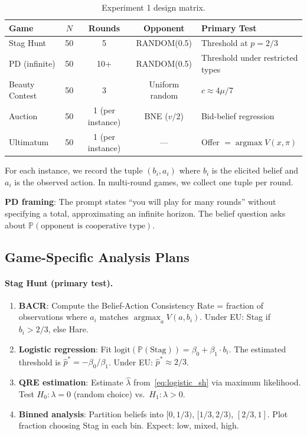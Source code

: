 \documentclass[12pt]{article}
\newcommand{\Prob}{\mathbb{P}}
\newcommand{\argmax}{\operatorname{argmax}}
\begin{document}
\begin{table}[h]
\centering
\caption{Experiment 1 design matrix.}
\label{tab:exp1}
\begin{tabular}{@{}lcccl@{}}
\toprule
Game & $N$ & Rounds & Opponent & Primary Test \\
\midrule
Stag Hunt & 50 & 5 & RANDOM(0.5) & Threshold at $p = 2/3$ \\
PD (infinite) & 50 & 10+ & RANDOM(0.5) & Threshold under restricted types \\
Beauty Contest & 50 & 3 & Uniform random & $c \approx 4\mu/7$ \\
Auction & 50 & 1 (per instance) & BNE ($v/2$) & Bid-belief regression \\
Ultimatum & 50 & 1 (per instance) & --- & Offer $= \argmax V(x, \pi)$ \\
\bottomrule
\end{tabular}
\end{table}

For each instance, we record the tuple $(b_i, a_i)$ where $b_i$ is the elicited belief and $a_i$ is the observed action. In multi-round games, we collect one tuple per round.

\textbf{PD framing}: The prompt states ``you will play for many rounds'' without specifying a total, approximating an infinite horizon. The belief question asks about $\Prob(\text{opponent is cooperative type})$.


\subsection{Game-Specific Analysis Plans}

\paragraph{Stag Hunt (primary test).}
\begin{enumerate}[nosep]
    \item \textbf{BACR}: Compute the Belief-Action Consistency Rate = fraction of observations where $a_i$ matches $\argmax_a V(a, b_i)$. Under EU: Stag if $b_i > 2/3$, else Hare.
    \item \textbf{Logistic regression}: Fit $\text{logit}(\Prob(\text{Stag})) = \beta_0 + \beta_1 \cdot b_i$. The estimated threshold is $\hat{p}^* = -\beta_0/\beta_1$. Under EU: $\hat{p}^* \approx 2/3$.
    \item \textbf{QRE estimation}: Estimate $\hat\lambda$ from~\eqref{eq:logistic_sh} via maximum likelihood. Test $H_0: \lambda = 0$ (random choice) vs.\ $H_1: \lambda > 0$.
    \item \textbf{Binned analysis}: Partition beliefs into $[0, 1/3)$, $[1/3, 2/3)$, $[2/3, 1]$. Plot fraction choosing Stag in each bin. Expect: low, mixed, high.
\end{enumerate}
\end{document}
